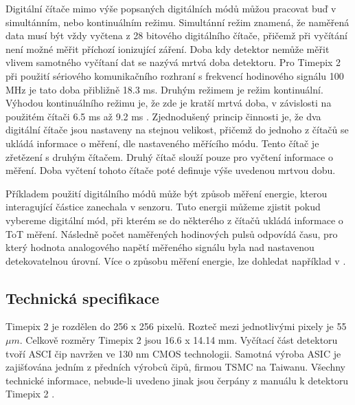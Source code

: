 \par Digitální čítače mimo výše popsaných digitálních módů můžou pracovat buď v simultánním, nebo kontinuálním režimu. Simultánní režim znamená, že naměřená data musí být vždy vyčtena z 28 bitového digitálního čítače, přičemž při vyčítání není možné měřit příchozí ionizující záření. Doba kdy detektor nemůže měřit vlivem samotného vyčítaní dat se nazývá mrtvá doba detektoru. Pro Timepix 2 při použití sériového komunikačního rozhraní s frekvencí hodinového signálu 100 MHz je tato doba přibližně 18.3 ms. Druhým režimem je režim kontinuální. Výhodou kontinuálního režimu je, že zde je kratší mrtvá doba, v závislosti na použitém čítači 6.5 ms až 9.2 ms . Zjednodušený princip činnosti je, že dva digitální čítače jsou nastaveny na stejnou velikost, přičemž do jednoho z čítačů se ukládá informace o měření, dle nastaveného měřícího módu. Tento čítač je zřetězení s druhým čítačem. Druhý čítač slouží pouze pro vyčtení informace o měření. Doba vyčtení tohoto čítače poté definuje výše uvedenou mrtvou dobu.
\par Příkladem použití digitálního módů může být způsob měření energie, kterou interagující částice zanechala v senzoru. Tuto energii můžeme zjistit pokud vybereme digitální mód, při kterém se do některého z čítačů ukládá informace o ToT měření. Následně počet naměřených hodinových pulsů odpovídá času, pro který hodnota analogového napětí měřeného signálu byla nad nastavenou detekovatelnou úrovní. Více o způsobu měření energie, lze dohledat například v \cite{JAKUBEK2011S262}.

\subsection{Technická specifikace} %
\label{Technicka specifikace}
Timepix 2 je rozdělen do 256 x 256 pixelů. Rozteč mezi jednotlivými pixely je 55 $\mu$$m$. Celkově rozměry Timepix 2 jsou 16.6 x 14.14 mm. Vyčítací část detektoru tvoří ASCI čip navržen ve 130 nm CMOS technologii. Samotná výroba ASIC je zajišťována jedním z předních výrobců čipů, firmou TSMC \cite{TSMC} na Taiwanu. Všechny technické informace, nebude-li uvedeno jinak jsou čerpány z manuálu k detektoru Timepix 2 \cite{tpx2_manual}.

